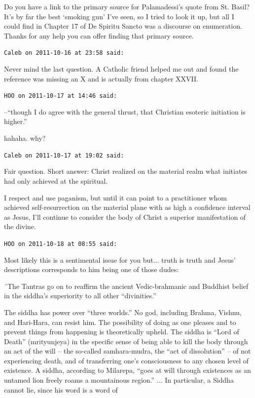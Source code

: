 \begin{footnotesize}
\begin{sffamily}
Do you have a link to the primary source for Palamadessi's quote from St. Basil? It's by far the best `smoking gun' I've seen, so I tried to look it up, but all I could find in Chapter 17 of De Spiritu Sancto was a discourse on enumeration. Thanks for any help you can offer finding that primary source.

\hfill

\texttt{Caleb on 2011-10-16 at 23:58 said:}

Never mind the last question. A Catholic friend helped me out and found the reference was missing an X and is actually from chapter XXVII.

\hfill

\texttt{HOO on 2011-10-17 at 14:46 said:}

--``though I do agree with the general thrust, that Christian esoteric initiation is higher.''

hahaha. why?

\hfill

\texttt{Caleb on 2011-10-17 at 19:02 said:}

Fair question. Short answer: Christ realized on the material realm what initiates had only achieved at the spiritual.

I respect and use paganism, but until it can point to a practitioner whom achieved self-resurrection on the material plane with as high a confidence interval as Jesus, I'll continue to consider the body of Christ a superior manifestation of the divine.

\hfill

\texttt{HOO on 2011-10-18 at 08:55 said:}

Most likely this is a sentimental issue for you but... truth is truth and Jesus' descriptions corresponds to him being one of those dudes:

´The Tantras go on to reaffirm the ancient Vedic-brahmanic and Buddhist belief in the siddha's superiority to all other ``divinities.''

The siddha has power over ``three worlds.'' No god, including Brahma, Vishnu, and Hari-Hara, can resist him. The possibility of doing as one pleases and to prevent things from happening is theoretically upheld. The siddha is ``Lord of Death'' (mrityunjeya) in the specific sense of being able to kill the body through an act of the will -- the so-called samhara-mudra, the ``act of dissolution'' -- of not experiencing death, and of transferring one's consciousness to any chosen level of existence. A siddha, according to Milarepa, ``goes at will through existences as an untamed lion freely roams a mountainous region.''
... In particular, a Siddha cannot lie, since his word is a word of


\end{sffamily}
\end{footnotesize}
